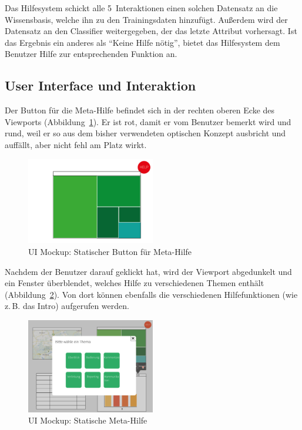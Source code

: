 \documentclass[
	headsepline,
	footsepline,
	fontsize=12pt,
	bibliography=totoc
]{scrbook}
\begin{document}
Das Hilfesystem schickt alle 5~Interaktionen einen solchen Datensatz an die Wissensbasis, welche ihn zu den Trainingsdaten hinzufügt. Außerdem wird der Datensatz an den Classifier weitergegeben, der das letzte Attribut vorhersagt. Ist das Ergebnis ein anderes als \enquote{Keine Hilfe nötig}, bietet das Hilfesystem dem Benutzer Hilfe zur entsprechenden Funktion an.

\subsection{User Interface und Interaktion}

Der Button für die Meta-Hilfe befindet sich in der rechten oberen Ecke des Viewports (Abbildung~\ref{figure:meta-step1}). Er ist rot, damit er vom Benutzer bemerkt wird und rund, weil er so aus dem bisher verwendeten optischen Konzept ausbricht und auffällt, aber nicht fehl am Platz wirkt.

\begin{figure}[htbp]
   \centering
   \includegraphics[width=0.5\textwidth]{images/konzeption-meta-step1.png}
   \caption{UI Mockup: Statischer Button für Meta-Hilfe}
   \label{figure:meta-step1}
\end{figure}

Nachdem der Benutzer darauf geklickt hat, wird der Viewport abgedunkelt und ein Fenster überblendet, welches Hilfe zu verschiedenen Themen enthält (Abbildung~\ref{figure:meta-step2}). Von dort können ebenfalls die verschiedenen Hilfefunktionen (wie z.\,B. das Intro) aufgerufen werden.

\begin{figure}[htbp]
   \centering
   \includegraphics[width=0.5\textwidth]{images/konzeption-meta-step2.png}
   \caption{UI Mockup: Statische Meta-Hilfe}
   \label{figure:meta-step2}
\end{figure}
\end{document}
